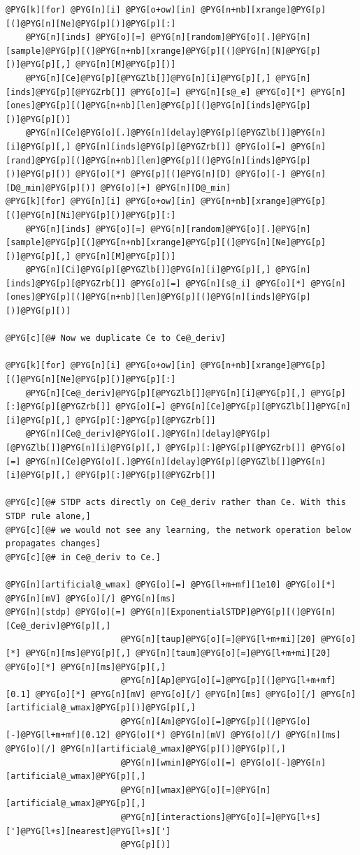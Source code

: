 \documentclass[letterpaper,10pt,english]{manual}
\begin{document}
\begin{Verbatim}[commandchars=@\[\]]
@PYG[k][for] @PYG[n][i] @PYG[o+ow][in] @PYG[n+nb][xrange]@PYG[p][(]@PYG[n][Ne]@PYG[p][)]@PYG[p][:]
    @PYG[n][inds] @PYG[o][=] @PYG[n][random]@PYG[o][.]@PYG[n][sample]@PYG[p][(]@PYG[n+nb][xrange]@PYG[p][(]@PYG[n][N]@PYG[p][)]@PYG[p][,] @PYG[n][M]@PYG[p][)]
    @PYG[n][Ce]@PYG[p][@PYGZlb[]]@PYG[n][i]@PYG[p][,] @PYG[n][inds]@PYG[p][@PYGZrb[]] @PYG[o][=] @PYG[n][s@_e] @PYG[o][*] @PYG[n][ones]@PYG[p][(]@PYG[n+nb][len]@PYG[p][(]@PYG[n][inds]@PYG[p][)]@PYG[p][)]
    @PYG[n][Ce]@PYG[o][.]@PYG[n][delay]@PYG[p][@PYGZlb[]]@PYG[n][i]@PYG[p][,] @PYG[n][inds]@PYG[p][@PYGZrb[]] @PYG[o][=] @PYG[n][rand]@PYG[p][(]@PYG[n+nb][len]@PYG[p][(]@PYG[n][inds]@PYG[p][)]@PYG[p][)] @PYG[o][*] @PYG[p][(]@PYG[n][D] @PYG[o][-] @PYG[n][D@_min]@PYG[p][)] @PYG[o][+] @PYG[n][D@_min]
@PYG[k][for] @PYG[n][i] @PYG[o+ow][in] @PYG[n+nb][xrange]@PYG[p][(]@PYG[n][Ni]@PYG[p][)]@PYG[p][:]
    @PYG[n][inds] @PYG[o][=] @PYG[n][random]@PYG[o][.]@PYG[n][sample]@PYG[p][(]@PYG[n+nb][xrange]@PYG[p][(]@PYG[n][Ne]@PYG[p][)]@PYG[p][,] @PYG[n][M]@PYG[p][)]
    @PYG[n][Ci]@PYG[p][@PYGZlb[]]@PYG[n][i]@PYG[p][,] @PYG[n][inds]@PYG[p][@PYGZrb[]] @PYG[o][=] @PYG[n][s@_i] @PYG[o][*] @PYG[n][ones]@PYG[p][(]@PYG[n+nb][len]@PYG[p][(]@PYG[n][inds]@PYG[p][)]@PYG[p][)]

@PYG[c][@# Now we duplicate Ce to Ce@_deriv]

@PYG[k][for] @PYG[n][i] @PYG[o+ow][in] @PYG[n+nb][xrange]@PYG[p][(]@PYG[n][Ne]@PYG[p][)]@PYG[p][:]
    @PYG[n][Ce@_deriv]@PYG[p][@PYGZlb[]]@PYG[n][i]@PYG[p][,] @PYG[p][:]@PYG[p][@PYGZrb[]] @PYG[o][=] @PYG[n][Ce]@PYG[p][@PYGZlb[]]@PYG[n][i]@PYG[p][,] @PYG[p][:]@PYG[p][@PYGZrb[]]
    @PYG[n][Ce@_deriv]@PYG[o][.]@PYG[n][delay]@PYG[p][@PYGZlb[]]@PYG[n][i]@PYG[p][,] @PYG[p][:]@PYG[p][@PYGZrb[]] @PYG[o][=] @PYG[n][Ce]@PYG[o][.]@PYG[n][delay]@PYG[p][@PYGZlb[]]@PYG[n][i]@PYG[p][,] @PYG[p][:]@PYG[p][@PYGZrb[]]

@PYG[c][@# STDP acts directly on Ce@_deriv rather than Ce. With this STDP rule alone,]
@PYG[c][@# we would not see any learning, the network operation below propagates changes]
@PYG[c][@# in Ce@_deriv to Ce.]

@PYG[n][artificial@_wmax] @PYG[o][=] @PYG[l+m+mf][1e10] @PYG[o][*] @PYG[n][mV] @PYG[o][/] @PYG[n][ms]
@PYG[n][stdp] @PYG[o][=] @PYG[n][ExponentialSTDP]@PYG[p][(]@PYG[n][Ce@_deriv]@PYG[p][,]
                       @PYG[n][taup]@PYG[o][=]@PYG[l+m+mi][20] @PYG[o][*] @PYG[n][ms]@PYG[p][,] @PYG[n][taum]@PYG[o][=]@PYG[l+m+mi][20] @PYG[o][*] @PYG[n][ms]@PYG[p][,]
                       @PYG[n][Ap]@PYG[o][=]@PYG[p][(]@PYG[l+m+mf][0.1] @PYG[o][*] @PYG[n][mV] @PYG[o][/] @PYG[n][ms] @PYG[o][/] @PYG[n][artificial@_wmax]@PYG[p][)]@PYG[p][,]
                       @PYG[n][Am]@PYG[o][=]@PYG[p][(]@PYG[o][-]@PYG[l+m+mf][0.12] @PYG[o][*] @PYG[n][mV] @PYG[o][/] @PYG[n][ms] @PYG[o][/] @PYG[n][artificial@_wmax]@PYG[p][)]@PYG[p][,]
                       @PYG[n][wmin]@PYG[o][=] @PYG[o][-]@PYG[n][artificial@_wmax]@PYG[p][,]
                       @PYG[n][wmax]@PYG[o][=]@PYG[n][artificial@_wmax]@PYG[p][,]
                       @PYG[n][interactions]@PYG[o][=]@PYG[l+s][']@PYG[l+s][nearest]@PYG[l+s][']
                       @PYG[p][)]


\end{Verbatim}
\end{document}
